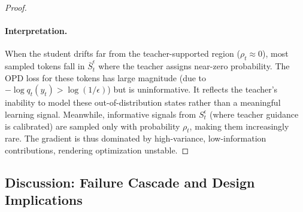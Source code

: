 \begin{proof}
\paragraph{Interpretation.} When the student drifts far from the teacher-supported region ($\rho_t \approx 0$), most sampled tokens fall in $\bar{S}_t^\epsilon$ where the teacher assigns near-zero probability. The OPD loss for these tokens has large magnitude (due to $-\log q_t(y_t) > \log(1/\epsilon)$) but is uninformative. It reflects the teacher's inability to model these out-of-distribution states rather than a meaningful learning signal. Meanwhile, informative signals from $S_t^\epsilon$ (where teacher guidance is calibrated) are sampled only with probability $\rho_t$, making them increasingly rare. The gradient is thus dominated by high-variance, low-information contributions, rendering optimization unstable.
\end{proof}


\subsection{Discussion: Failure Cascade and Design Implications}
\label{app:discussion_objective}

